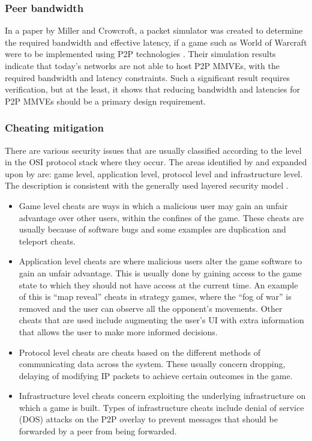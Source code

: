 \subsubsection{Peer bandwidth}
\label{peer_bandwidth_usage}

In a paper by Miller and Crowcroft, a packet simulator was created to determine the required bandwidth and effective latency, if a game such as World of Warcraft were to be implemented using P2P technologies \cite{Miller_p2p_infeasability}. Their simulation results indicate that today's networks are not able to host P2P MMVEs, with the required bandwidth and latency constraints. Such a significant result requires verification, but at the least, it shows that reducing bandwidth and latencies for P2P MMVEs should be a primary design requirement.

\subsubsection{Cheating mitigation}
\label{key_challenges_cheating}

There are various security issues that are usually classified according to the level in the OSI protocol stack where they occur. The areas identified by \cite{cheat_proof_event_ordering} and expanded upon by \cite{cheating_taxonomy} are: game level, application level, protocol level and infrastructure level. The description is consistent with the generally used layered security model \cite{distributed_systems_security}.

\begin{itemize}
\item Game level cheats are ways in which a malicious user may gain an unfair advantage over other users, within the confines of the game. These cheats are usually because of software bugs and some examples are duplication and teleport cheats.

\item Application level cheats are where malicious users alter the game software to gain an unfair advantage. This is usually done by gaining access to the game state to which they should not have access at the current time. An example of this is ``map reveal'' cheats in strategy games, where the ``fog of war'' is removed and the user can observe all the opponent's movements. Other cheats that are used include augmenting the user's UI with extra information that allows the user to make more informed decisions.

\item Protocol level cheats are cheats based on the different methods of communicating data across the system. These usually concern dropping, delaying of modifying IP packets to achieve certain outcomes in the game.

\item Infrastructure level cheats concern exploiting the underlying infrastructure on which a game is built. Types of infrastructure cheats include denial of service (DOS) attacks on the P2P overlay to prevent messages that should be forwarded by a peer from being forwarded.
\end{itemize}

